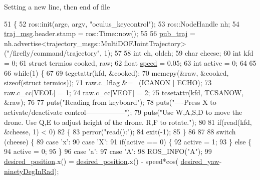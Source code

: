 Setting a new line, then end of file 
\begin{DoxyCode}
51 \{
52   ros::init(argc, argv, \textcolor{stringliteral}{"oculus\_keycontrol"});
53   ros::NodeHandle nh;
54   \hyperlink{oculus-control-keyboard_8cpp_a090c0766fbb77862dd8cc0cca99d688b}{traj\_msg}.header.stamp = ros::Time::now();
55 
56   \hyperlink{oculus-control-keyboard_8cpp_a92b67ae724bc0d23b8e85e92e89403df}{pub\_traj} = nh.advertise<trajectory\_msgs::MultiDOFJointTrajectory>(\textcolor{stringliteral}{"/firefly/command/trajectory"}, 
      1);
57 
58   \textcolor{keywordtype}{int} ch, oldch;
59   \textcolor{keywordtype}{char} cheese;
60   \textcolor{keywordtype}{int} kfd = 0;
61   \textcolor{keyword}{struct }termios cooked, raw;
62   \textcolor{keywordtype}{float} \hyperlink{oculus-control-keyboard_8cpp_a7f7e4724cf57d59513b39c5ecc81adc8}{speed} = 0.05;
63   \textcolor{keywordtype}{int} active = 0;
64 
65 
66   \textcolor{keywordflow}{while}(1) \{
67 
69     tcgetattr(kfd, &cooked);
70     memcpy(&raw, &cooked, \textcolor{keyword}{sizeof}(\textcolor{keyword}{struct} termios));
71     raw.c\_lflag &=~ (ICANON | ECHO);
73     raw.c\_cc[VEOL] = 1;
74     raw.c\_cc[VEOF] = 2;
75     tcsetattr(kfd, TCSANOW, &raw);
76 
77     puts(\textcolor{stringliteral}{"Reading from keyboard"});
78     puts(\textcolor{stringliteral}{"----Press X to activate/deactivate control-----------------"});
79     puts(\textcolor{stringliteral}{"Use W,A,S,D to move the drone. Use Q,E to adjust height of the drone. R,F to rotate."});
80 
81     \textcolor{keywordflow}{if}(read(kfd, &cheese, 1) < 0)
82     \{
83       perror(\textcolor{stringliteral}{"read():"});
84       exit(-1);
85     \}
86 
87 
88     \textcolor{keywordflow}{switch} (cheese) \{
89       \textcolor{keywordflow}{case} \textcolor{charliteral}{'x'}:
90       \textcolor{keywordflow}{case} \textcolor{charliteral}{'X'}:
91         \textcolor{keywordflow}{if}(active == 0) \{
92           active = 1;
93         \} \textcolor{keywordflow}{else} \{
94           active = 0;
95         \}
96       \textcolor{keywordflow}{case} \textcolor{charliteral}{'a'}:
97       \textcolor{keywordflow}{case} \textcolor{charliteral}{'A'}:
98         ROS\_INFO(\textcolor{stringliteral}{"A"});
99         \hyperlink{oculus-control-keyboard_8cpp_a608d9948c063034b7605598daaeccc3e}{desired\_position}.x() = \hyperlink{oculus-control-keyboard_8cpp_a608d9948c063034b7605598daaeccc3e}{desired\_position}.x() - speed*cos(
      \hyperlink{oculus-control-keyboard_8cpp_a03a69ef33d756512293e67791ab5f265}{desired\_yaw}-\hyperlink{oculus-control-keyboard_8cpp_a2cce9b626fdb3b1f78baad955bd5b609}{ninetyDegInRad});

\end{DoxyCode}
